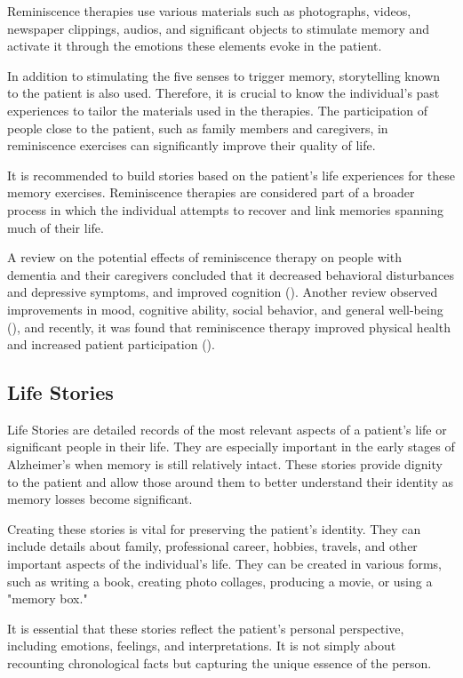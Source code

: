 Reminiscence therapies use various materials such as photographs, videos, newspaper clippings, audios, and significant objects to stimulate memory and activate it through the emotions these elements evoke in the patient.

In addition to stimulating the five senses to trigger memory, storytelling known to the patient is also used. Therefore, it is crucial to know the individual's past experiences to tailor the materials used in the therapies. The participation of people close to the patient, such as family members and caregivers, in reminiscence exercises can significantly improve their quality of life.

It is recommended to build stories based on the patient's life experiences for these memory exercises. Reminiscence therapies are considered part of a broader process in which the individual attempts to recover and link memories spanning much of their life.

A review on the potential effects of reminiscence therapy on people with dementia and their caregivers concluded that it decreased behavioral disturbances and depressive symptoms, and improved cognition (\cite{huang2015reminiscence}). Another review observed improvements in mood, cognitive ability, social behavior, and general well-being (\cite{cotelli2012reminiscence}), and recently, it was found that reminiscence therapy improved physical health and increased patient participation (\cite{irazoki2027eficacia}).

\subsection{Life Stories}
Life Stories are detailed records of the most relevant aspects of a patient's life or significant people in their life. They are especially important in the early stages of Alzheimer's when memory is still relatively intact. These stories provide dignity to the patient and allow those around them to better understand their identity as memory losses become significant.

Creating these stories is vital for preserving the patient's identity. They can include details about family, professional career, hobbies, travels, and other important aspects of the individual's life. They can be created in various forms, such as writing a book, creating photo collages, producing a movie, or using a "memory box."

It is essential that these stories reflect the patient's personal perspective, including emotions, feelings, and interpretations. It is not simply about recounting chronological facts but capturing the unique essence of the person.


